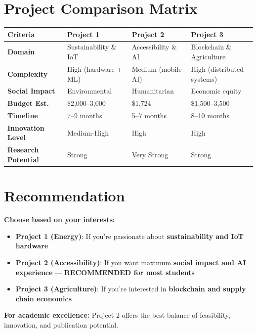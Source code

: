 \documentclass[12pt,a4paper]{article}
\begin{document}
\section{Project Comparison Matrix}

\begin{longtable}{|p{2.2cm}|p{2.8cm}|p{2.8cm}|p{2.8cm}|}
\hline
\textbf{Criteria} & \textbf{Project 1} & \textbf{Project 2} & \textbf{Project 3} \\
\hline
\endhead
\textbf{Domain} & Sustainability \& IoT & Accessibility \& AI & Blockchain \& Agriculture \\
\hline
\textbf{Complexity} & High (hardware + ML) & Medium (mobile AI) & High (distributed systems) \\
\hline
\textbf{Social Impact} & Environmental & Humanitarian & Economic equity \\
\hline
\textbf{Budget Est.} & \$2,000--3,000 & \$1,724 & \$1,500--3,500 \\
\hline
\textbf{Timeline} & 7--9 months & 5--7 months & 8--10 months \\
\hline
\textbf{Innovation Level} & Medium-High & High & High \\
\hline
\textbf{Research Potential} & Strong & Very Strong & Strong \\
\hline
\end{longtable}

\section{Recommendation}

\textbf{Choose based on your interests:}
\begin{itemize}
    \item \textbf{Project 1 (Energy)}: If you're passionate about \textbf{sustainability and IoT hardware}
    \item \textbf{Project 2 (Accessibility)}: If you want maximum \textbf{social impact and AI experience} --- \textbf{RECOMMENDED for most students}
    \item \textbf{Project 3 (Agriculture)}: If you're interested in \textbf{blockchain and supply chain economics}
\end{itemize}

\textbf{For academic excellence:} Project 2 offers the best balance of feasibility, innovation, and publication potential.
\end{document}
